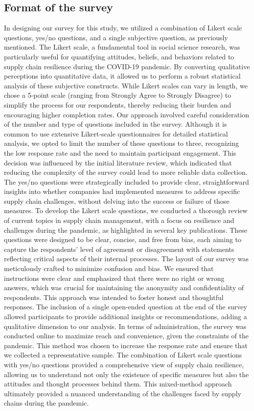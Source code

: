 \subsection{Format of the survey}
In designing our survey for this study, we utilized a combination of Likert scale questions, yes/no questions, and a single subjective question, as previously mentioned. The Likert scale, a fundamental tool in social science research, was particularly useful for quantifying attitudes, beliefs, and behaviors related to supply chain resilience during the COVID-19 pandemic. By converting qualitative perceptions into quantitative data, it allowed us to perform a robust statistical analysis of these subjective constructs. While Likert scales can vary in length, we chose a 5-point scale (ranging from Strongly Agree to Strongly Disagree) to simplify the process for our respondents, thereby reducing their burden and encouraging higher completion rates. Our approach involved careful consideration of the number and type of questions included in the survey. Although it is common to use extensive Likert-scale questionnaires for detailed statistical analysis, we opted to limit the number of these questions to three, recognizing the low response rate and the need to maintain participant engagement. This decision was influenced by the initial literature review, which indicated that reducing the complexity of the survey could lead to more reliable data collection. The yes/no questions were strategically included to provide clear, straightforward insights into whether companies had implemented measures to address specific supply chain challenges, without delving into the success or failure of those measures. To develop the Likert scale questions, we conducted a thorough review of current topics in supply chain management, with a focus on resilience and challenges during the pandemic, as highlighted in several key publications. These questions were designed to be clear, concise, and free from bias, each aiming to capture the respondents' level of agreement or disagreement with statements reflecting critical aspects of their internal processes. The layout of our survey was meticulously crafted to minimize confusion and bias. We ensured that instructions were clear and emphasized that there were no right or wrong answers, which was crucial for maintaining the anonymity and confidentiality of respondents. This approach was intended to foster honest and thoughtful responses. The inclusion of a single open-ended question at the end of the survey allowed participants to provide additional insights or recommendations, adding a qualitative dimension to our analysis. In terms of administration, the survey was conducted online to maximize reach and convenience, given the constraints of the pandemic. This method was chosen to increase the response rate and ensure that we collected a representative sample. The combination of Likert scale questions with yes/no questions provided a comprehensive view of supply chain resilience, allowing us to understand not only the existence of specific measures but also the attitudes and thought processes behind them. This mixed-method approach ultimately provided a nuanced understanding of the challenges faced by supply chains during the pandemic.

